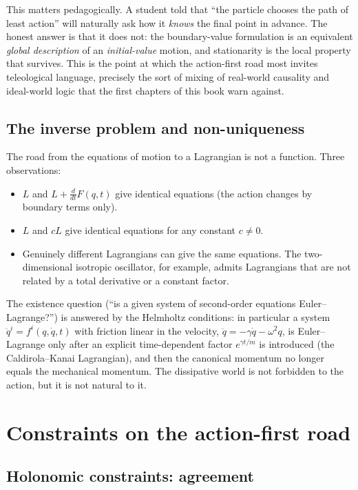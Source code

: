 This matters pedagogically. A student told that ``the particle chooses the
path of least action'' will naturally ask how it \emph{knows} the final point
in advance. The honest answer is that it does not: the boundary-value
formulation is an equivalent \emph{global description} of an \emph{initial-value}
motion, and stationarity is the local property that survives. This is the
point at which the action-first road most invites teleological language,
precisely the sort of mixing of real-world causality and ideal-world logic
that the first chapters of this book warn against.

\subsection{The inverse problem and non-uniqueness}
\label{sec:inverse}

The road from the equations of motion to a Lagrangian is not a function. Three
observations:
\begin{itemize}
  \item $L$ and $L+\frac{d}{dt}F(q,t)$ give identical equations (the action
  changes by boundary terms only).
  \item $L$ and $cL$ give identical equations for any constant $c\neq0$.
  \item Genuinely different Lagrangians can give the same equations. The
  two-dimensional isotropic oscillator, for example, admits Lagrangians that
  are not related by a total derivative or a constant factor.
\end{itemize}
The existence question (``is a given system of second-order equations
Euler--Lagrange?'') is answered by the Helmholtz conditions: in particular a
system $\ddot q^i=f^i(q,\dot q,t)$ with friction linear in the velocity,
$\ddot q=-\gamma\dot q-\omega^2q$, is Euler--Lagrange only after an explicit
time-dependent factor $e^{\gamma t/m}$ is introduced (the Caldirola--Kanai
Lagrangian), and then the canonical momentum no longer equals the mechanical
momentum. The dissipative world is not forbidden to the action, but it is not
natural to it.

\section{Constraints on the action-first road}
\label{sec:constraints-variational}

\subsection{Holonomic constraints: agreement}

